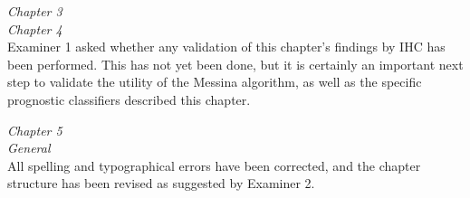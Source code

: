 \documentclass[a4paper,12pt,stdletter,sigleft]{newlfm}
\begin{document}
\begin{newlfm}
\emph{Chapter 3} \\

\emph{Chapter 4} \\
Examiner 1 asked whether any validation of this chapter's findings by IHC has been performed.  This has not yet been done, but it is certainly an important next step to validate the utility of the Messina algorithm, as well as the specific prognostic classifiers described this chapter.

\emph{Chapter 5} \\

\emph{General} \\

All spelling and typographical errors have been corrected, and the chapter structure has been revised as suggested by Examiner 2.


\end{newlfm}
\end{document}
